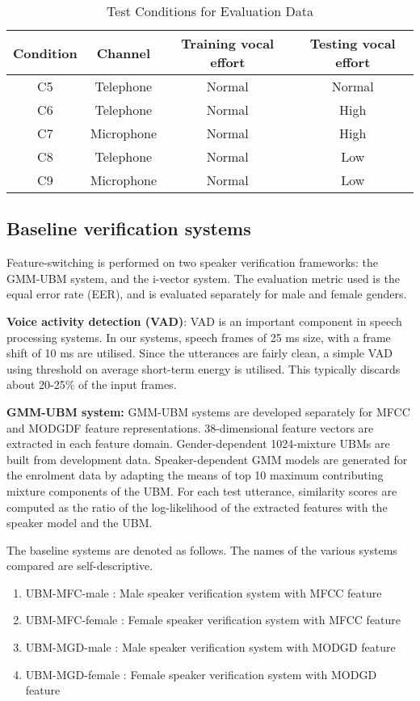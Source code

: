 \documentclass{article}
\begin{document}
\begin{table}[h!tb]
\centering
\caption{Test Conditions for Evaluation Data}
\begin{tabular}{|c|c|c|c|}
\hline
Condition & Channel & Training vocal effort & Testing vocal effort \\ 
\hline \hline
C5 & Telephone & Normal & Normal \\ \hline
C6 & Telephone & Normal & High \\ \hline
C7 & Microphone & Normal & High \\ \hline
C8 & Telephone & Normal & Low \\ \hline
C9 & Microphone & Normal & Low \\ \hline
\end{tabular}
\label{tab:datasetConditions}
\end{table}



\subsection{Baseline verification systems}
\label{subsec:baseline}

Feature-switching is performed on two speaker verification frameworks: the GMM-UBM system, 
and the i-vector system. The evaluation
metric used is the equal error rate (EER), and is evaluated separately
for male and female genders.

\textbf{Voice activity detection (VAD)}: VAD is an important component in speech
processing systems. In our systems, speech frames of 25 ms size, with a frame
shift of 10 ms are utilised. Since the utterances are fairly clean, a simple VAD
using threshold on average short-term energy is utilised. This typically
discards about 20-25\% of the input frames.

\textbf{GMM-UBM system:} GMM-UBM systems are developed separately for 
MFCC and MODGDF feature representations. 38-dimensional feature vectors are 
extracted in each feature domain. Gender-dependent 1024-mixture UBMs are built 
from development data.  Speaker-dependent GMM models are generated for the 
enrolment data by adapting the means of top 10 maximum contributing mixture 
components of the UBM. For each test utterance, similarity scores are computed 
as the ratio of the log-likelihood of the extracted features with the speaker
model and the UBM.

The baseline systems are denoted as follows. The names of the various systems
compared are self-descriptive.
\begin{enumerate}
\item UBM-MFC-male : Male speaker verification system with MFCC feature
\item UBM-MFC-female : Female speaker verification system with MFCC feature
\item UBM-MGD-male : Male speaker verification system with MODGD feature
\item UBM-MGD-female : Female speaker verification system with MODGD feature
\end{enumerate}
\end{document}
